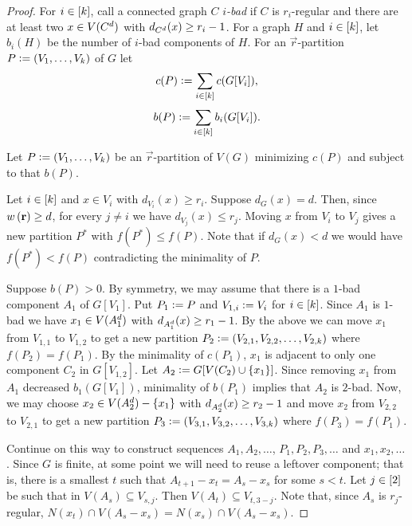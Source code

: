 		\begin{proof}
			For $i \in \left[k\right]$, call a connected graph $C$
			\emph{$i$-bad} if $C$ is $r_i$-regular and there are at least two $x \in
			V(C^{d})$ with $d_{C^{d}}(x) \geq r_i - 1$. For a graph $H$ and $i
			\in \left[k\right]$, let $b_i(H)$ be the number of $i$-bad components of $H$.
			For an $\vec{r}$-partition $P \mathrel{\mathop:}= \left( V_1, \ldots, V_k \right)$ of $G$ let
			\[c(P) \mathrel{\mathop:}= \sum_{i \in \left[k\right]} c(G[V_i]),\]
			\[b(P) \mathrel{\mathop:}= \sum_{i\in \left[k\right]} b_i(G[V_i]).\]
			
			\noindent Let $P \mathrel{\mathop:}= \left( V_1, \ldots, V_k \right)$ be an $\vec{r}$-partition of
			$V(G)$ minimizing $c(P)$ and subject to that $b(P)$.

			Let $i \in \left[k\right]$ and $x \in V_i$ with $d_{V_i}(x) \geq r_i$.  Suppose $d_G(x) = d$.
			Then, since $w\left( \mathbf{r} \right) \geq d$, for every $j \neq i$ we have $d_{V_j}(x) \leq
			r_j$. Moving $x$ from $V_i$ to $V_j$ gives a new partition $P^*$ with $f(P^*)
			\leq f(P)$. Note that if $d_{G}(x) < d$ we would have $f(P^*) < f(P)$
			contradicting the minimality of $P$.

			Suppose $b(P) > 0$.  By symmetry, we may assume that there is a
			$1$-bad component $A_1$ of $G[V_{1}]$. Put $P_1 \mathrel{\mathop:}= P$ and $V_{1,i}
			\mathrel{\mathop:}= V_i$ for $i \in \left[k\right]$. Since $A_1$ is $1$-bad we have $x_1
			\in V(A_1^{d})$ with $d_{A_1^{d}}(x) \geq r_1 -1$. By the above we
			can move $x_1$ from $V_{1, 1}$ to $V_{1, 2}$ to get a new partition $P_2
			\mathrel{\mathop:}= \left( V_{2, 1}, V_{2,2}, \ldots, V_{2,k} \right)$ where $f(P_2) = f(P_1)$.  
			By the minimality of $c(P_1)$, $x_1$ is adjacent to only one component $C_2$
			in $G[V_{1, 2}]$. Let $A_2 \mathrel{\mathop:}= G[V(C_2) \cup \left\{ x_1 \right\}]$.  
			Since removing $x_1$ from $A_1$ decreased $b_{1}(G[V_{1}])$, minimality of
			$b(P_1)$ implies that $A_2$ is $2$-bad. Now, we may choose $x_2 \in
			V(A_2^{d}) - \left\{ x_1 \right\}$ with $d_{A_2^{d}}(x) \geq r_2 -1$ and move
			$x_2$ from $V_{2, 2}$ to $V_{2, 1}$ to get a new partition $P_3
			\mathrel{\mathop:}= \left( V_{3, 1}, V_{3,2}, \ldots, V_{3,k} \right)$ where $f(P_3) =
			f(P_1)$.
						
			Continue on this way to construct sequences $A_1, A_2, \ldots$, $P_1, P_2, P_3, \ldots$ and $x_1, x_2, \ldots$.  
			Since $G$ is finite, at some point we will need to reuse a leftover component; that is, 
			there is a smallest $t$ such that $A_{t + 1} - x_t = A_s - x_s$ for some $s <
			t$.  Let $j \in \left[2\right]$ be such that in $V(A_s) \subseteq V_{s, j}$. 
			Then $V(A_t) \subseteq V_{t, 3-j}$.  Note that, since $A_s$ is $r_j$-regular,
			$N(x_t) \cap V(A_s - x_s) = N(x_s) \cap V(A_s - x_s)$.
			

\end{proof}
